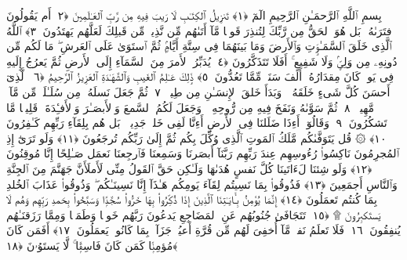 
  
    
  
    
    

\nopagebreak
  بِسمِ ٱللَّهِ ٱلرَّحمَـٰنِ ٱلرَّحِيمِ
  الٓمٓ ﴿١﴾
 تَنزِيلُ ٱلكِتَـٰبِ لَا رَيبَ فِيهِ مِن رَّبِّ ٱلعَـٰلَمِينَ ﴿٢﴾
 أَم يَقُولُونَ ٱفتَرَىٰهُ ۚ بَل هُوَ ٱلحَقُّ مِن رَّبِّكَ لِتُنذِرَ قَومًۭا مَّآ أَتَىٰهُم مِّن نَّذِيرٍۢ مِّن قَبلِكَ لَعَلَّهُم يَهتَدُونَ ﴿٣﴾
 ٱللَّهُ ٱلَّذِى خَلَقَ ٱلسَّمَـٰوَٟتِ وَٱلأَرضَ وَمَا بَينَهُمَا فِى سِتَّةِ أَيَّامٍۢ ثُمَّ ٱستَوَىٰ عَلَى ٱلعَرشِ ۖ مَا لَكُم مِّن دُونِهِۦ مِن وَلِىٍّۢ وَلَا شَفِيعٍ ۚ أَفَلَا تَتَذَكَّرُونَ ﴿٤﴾
 يُدَبِّرُ ٱلأَمرَ مِنَ ٱلسَّمَآءِ إِلَى ٱلأَرضِ ثُمَّ يَعرُجُ إِلَيهِ فِى يَومٍۢ كَانَ مِقدَارُهُۥٓ أَلفَ سَنَةٍۢ مِّمَّا تَعُدُّونَ ﴿٥﴾
 ذَٟلِكَ عَـٰلِمُ ٱلغَيبِ وَٱلشَّهَـٰدَةِ ٱلعَزِيزُ ٱلرَّحِيمُ ﴿٦﴾
 ٱلَّذِىٓ أَحسَنَ كُلَّ شَىءٍ خَلَقَهُۥ ۖ وَبَدَأَ خَلقَ ٱلإِنسَـٰنِ مِن طِينٍۢ ﴿٧﴾
 ثُمَّ جَعَلَ نَسلَهُۥ مِن سُلَـٰلَةٍۢ مِّن مَّآءٍۢ مَّهِينٍۢ ﴿٨﴾
 ثُمَّ سَوَّىٰهُ وَنَفَخَ فِيهِ مِن رُّوحِهِۦ ۖ وَجَعَلَ لَكُمُ ٱلسَّمعَ وَٱلأَبصَـٰرَ وَٱلأَفـِٔدَةَ ۚ قَلِيلًۭا مَّا تَشكُرُونَ ﴿٩﴾
 وَقَالُوٓا۟ أَءِذَا ضَلَلنَا فِى ٱلأَرضِ أَءِنَّا لَفِى خَلقٍۢ جَدِيدٍۭ ۚ بَل هُم بِلِقَآءِ رَبِّهِم كَـٰفِرُونَ ﴿١٠﴾
 ۞ قُل يَتَوَفَّىٰكُم مَّلَكُ ٱلمَوتِ ٱلَّذِى وُكِّلَ بِكُم ثُمَّ إِلَىٰ رَبِّكُم تُرجَعُونَ ﴿١١﴾
 وَلَو تَرَىٰٓ إِذِ ٱلمُجرِمُونَ نَاكِسُوا۟ رُءُوسِهِم عِندَ رَبِّهِم رَبَّنَآ أَبصَرنَا وَسَمِعنَا فَٱرجِعنَا نَعمَل صَـٰلِحًا إِنَّا مُوقِنُونَ ﴿١٢﴾
 وَلَو شِئنَا لَءَاتَينَا كُلَّ نَفسٍ هُدَىٰهَا وَلَـٰكِن حَقَّ ٱلقَولُ مِنِّى لَأَملَأَنَّ جَهَنَّمَ مِنَ ٱلجِنَّةِ وَٱلنَّاسِ أَجمَعِينَ ﴿١٣﴾
 فَذُوقُوا۟ بِمَا نَسِيتُم لِقَآءَ يَومِكُم هَـٰذَآ إِنَّا نَسِينَـٰكُم ۖ وَذُوقُوا۟ عَذَابَ ٱلخُلدِ بِمَا كُنتُم تَعمَلُونَ ﴿١٤﴾
 إِنَّمَا يُؤمِنُ بِـَٔايَـٰتِنَا ٱلَّذِينَ إِذَا ذُكِّرُوا۟ بِهَا خَرُّوا۟ سُجَّدًۭا وَسَبَّحُوا۟ بِحَمدِ رَبِّهِم وَهُم لَا يَستَكبِرُونَ ۩ ﴿١٥﴾
 تَتَجَافَىٰ جُنُوبُهُم عَنِ ٱلمَضَاجِعِ يَدعُونَ رَبَّهُم خَوفًۭا وَطَمَعًۭا وَمِمَّا رَزَقنَـٰهُم يُنفِقُونَ ﴿١٦﴾
 فَلَا تَعلَمُ نَفسٌۭ مَّآ أُخفِىَ لَهُم مِّن قُرَّةِ أَعيُنٍۢ جَزَآءًۢ بِمَا كَانُوا۟ يَعمَلُونَ ﴿١٧﴾
 أَفَمَن كَانَ مُؤمِنًۭا كَمَن كَانَ فَاسِقًۭا ۚ لَّا يَستَوُۥنَ ﴿١٨﴾

